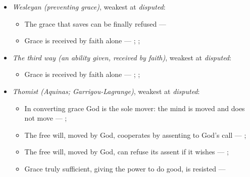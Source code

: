 \documentclass[11pt]{article}
\begin{document}
\begin{itemize}
\begin{itemize}
\item Conversion is God’s work alone: God regenerates, and the will does nothing to it --- \cite[Solid Declaration II.89]{concordia-triglotta-1921}; \cite[Solid Declaration II.90]{concordia-triglotta-1921}
\item Grace is received by faith alone --- \cite[Augsburg Confession IV.1–3]{concordia-triglotta-1921}; \cite[Sermon 1, III.1]{wesley-sermons-1872}; \cite[Trent, Session VI (1547), canon 9]{tanner-decrees-1990}
\end{itemize}
\item \emph{Wesleyan (preventing grace)}, weakest at \emph{disputed}:
\begin{itemize}
\item The grace that saves can be finally refused --- \cite[397]{wesley-works-9-1827}
\item Grace is received by faith alone --- \cite[Augsburg Confession IV.1–3]{concordia-triglotta-1921}; \cite[Sermon 1, III.1]{wesley-sermons-1872}; \cite[Trent, Session VI (1547), canon 9]{tanner-decrees-1990}
\end{itemize}
\item \emph{The third way (an ability given, received by faith)}, weakest at \emph{disputed}:
\begin{itemize}
\item Grace is received by faith alone --- \cite[Augsburg Confession IV.1–3]{concordia-triglotta-1921}; \cite[Sermon 1, III.1]{wesley-sermons-1872}; \cite[Trent, Session VI (1547), canon 9]{tanner-decrees-1990}
\end{itemize}
\item \emph{Thomist (Aquinas; Garrigou-Lagrange)}, weakest at \emph{disputed}:
\begin{itemize}
\item In converting grace God is the sole mover: the mind is moved and does not move --- \cite[I-II q.111 a.2]{aquinas-summa-1920}; \cite[ch. IV]{garrigou-lagrange-grace-1952}
\item The free will, moved by God, cooperates by assenting to God’s call --- \cite[Trent, Session VI (1547), canon 4]{tanner-decrees-1990}; \cite[45]{waterworth-trent-1848}
\item The free will, moved by God, can refuse its assent if it wishes --- \cite[Trent, Session VI (1547), canon 4]{tanner-decrees-1990}; \cite[45]{waterworth-trent-1848}
\item Grace truly sufficient, giving the power to do good, is resisted --- \cite[ch. VI]{garrigou-lagrange-grace-1952}

\end{itemize}
\end{itemize}
\end{document}
